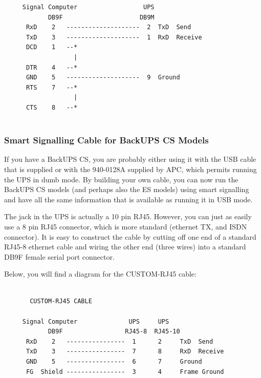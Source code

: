 {{{{{{{{{{\begin{verbatim}
     Signal Computer                  UPS
            DB9F                     DB9M
      RxD    2   --------------------  2  TxD  Send
      TxD    3   --------------------  1  RxD  Receive
      DCD    1   --*
                   |
      DTR    4   --*
      GND    5   --------------------  9  Ground
      RTS    7   --*
                   |
      CTS    8   --*
     
\end{verbatim}
\normalsize

\label{Smart-Signalling-Cable-for-BackUPS-CS-Models}

\subsubsection*{Smart Signalling Cable for BackUPS CS Models}

\label{index-Cables_002c-Smart-Signalling-194}
\label{index-Cables_002c-BackUPS-CS-195}
If you have a BackUPS CS, you are probably either using it with the USB cable
that is supplied or with the 940-0128A supplied by APC, which permits running
the UPS in dumb mode. By building your own cable, you can now run the BackUPS
CS models (and perhaps also the ES models) using smart signalling and have all
the same information that is available as running it in USB mode.  

The jack in the UPS is actually a 10 pin RJ45. However, you can just as easily
use a 8 pin RJ45 connector, which is more standard (ethernet TX, and ISDN
connector). It is easy to construct the cable by cutting off one end of a
standard RJ45-8 ethernet cable and wiring the other end (three wires) into a
standard DB9F female serial port connector.  

Below, you will find a diagram for the CUSTOM-RJ45 cable: 

\footnotesize
\begin{verbatim}
     
       CUSTOM-RJ45 CABLE
     
     Signal Computer              UPS     UPS
            DB9F                 RJ45-8  RJ45-10
      RxD    2   ----------------  1      2     TxD  Send
      TxD    3   ----------------  7      8     RxD  Receive
      GND    5   ----------------  6      7     Ground
      FG  Shield ----------------  3      4     Frame Ground
     

\end{verbatim}}}}}}}}}}}
